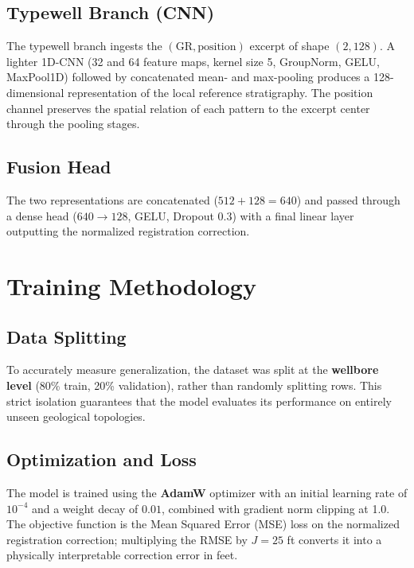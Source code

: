 \documentclass[12pt, a4paper]{article}
\begin{document}
    \subsection{Typewell Branch (CNN)}
    The typewell branch ingests the $(\text{GR}, \text{position})$ excerpt of shape $(2, 128)$. A lighter 1D-CNN (32 and 64 feature maps, kernel size 5, GroupNorm, GELU, MaxPool1D) followed by concatenated mean- and max-pooling produces a 128-dimensional representation of the local reference stratigraphy. The position channel preserves the spatial relation of each pattern to the excerpt center through the pooling stages.

    \subsection{Fusion Head}
    The two representations are concatenated ($512 + 128 = 640$) and passed through a dense head ($640 \rightarrow 128$, GELU, Dropout $0.3$) with a final linear layer outputting the normalized registration correction.

    \section{Training Methodology}

    \subsection{Data Splitting}
    To accurately measure generalization, the dataset was split at the \textbf{wellbore level} (80\% train, 20\% validation), rather than randomly splitting rows. This strict isolation guarantees that the model evaluates its performance on entirely unseen geological topologies.

    \subsection{Optimization and Loss}
    The model is trained using the \textbf{AdamW} optimizer with an initial learning rate of $10^{-4}$ and a weight decay of $0.01$, combined with gradient norm clipping at 1.0. The objective function is the Mean Squared Error (MSE) loss on the normalized registration correction; multiplying the RMSE by $J = 25$ ft converts it into a physically interpretable correction error in feet.
\end{document}
